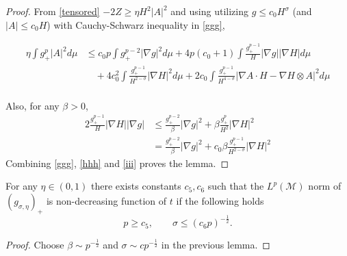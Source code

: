 \begin{proof}
    From \cref{tensored} $ -2Z \ge \eta H^{2}|A|^{2}  $ and using utilizing $ g \le c_{0}H^{\sigma} $ (and $ |A| \le c_{0}H $) with Cauchy-Schwarz inequality in \cref{ggg}, 

    \begin{align}
        \eta \int g_{+}^{p}|A|^{2}d \mu & \le  c_{0}p \int g_{+}^{p-2}|\nabla g|^{2}d \mu +  4p(c_{0}+1)\int \frac{g_{+}^{p-1}}{H} | \nabla g| | \nabla H| d \mu \nonumber\\
        & \quad + 4 c_{0}^{2}\int \frac{g_{+}^{p-1}}{H^{2-\sigma}}|\nabla H|^{2}d \mu + 2c_{0}\int \frac{g_{+}^{p-1}}{H^{4-\sigma}}| \nabla A \cdot H - \nabla H \otimes A|^{2}d \mu \nonumber \label{hhh}\\
    \end{align}

    Also, for any $ \beta >0 $,
    \begin{align}
        2 \frac{g_{+}^{p-1}}{H}|\nabla H| |\nabla g| & \le \frac{g_{+}^{p-2}}{\beta}|\nabla g|^{2}+ \beta \frac{g_{+}^{p}}{H^{2}}|\nabla H|^{2} \nonumber \\
        & = \frac{g_{+}^{p-2}}{\beta} | \nabla g|^{2}+ c_{0} \beta \frac{g_{+}^{p-1}}{H^{2-\sigma}}|\nabla H|^{2} \label{iii}
    \end{align}
    Combining \cref{ggg}, \cref{hhh} and \cref{iii} proves the lemma.
    \end{proof}

    \begin{proposition}\label{Lpbound}
        For any $ \eta \in (0,1) $ there exists constants $ c_{5}, c_{6}$ such that the $ L^{p}( \mathcal{M}) $ norm of $ (g_{\sigma, \eta})_{+} $ is non-decreasing function of $ t $ if the following holds 
        \[ p \ge c_{5}, \qquad \sigma \le (c_{6}p)^{- \frac{1}{2}}. \]
        
    \end{proposition}
    \begin{proof}
        Choose $ \beta  \sim p^{-\frac{1}{2}}$ and $ \sigma \sim c p^{-\frac{1}{2}} $ in the previous lemma.
    \end{proof}


